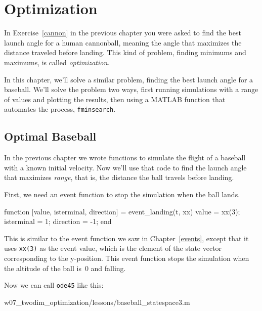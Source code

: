 \documentclass[../../book.tex]{subfiles}
\begin{document}
\chapter{Optimization}


In Exercise~\ref{cannon} in the previous chapter you were asked to find the best launch angle for a human cannonball, meaning the angle that maximizes the distance traveled before landing.  This kind of problem, finding minimums and maximums, is called \emph{optimization}.

In this chapter, we'll solve a similar problem, finding the best launch angle for a baseball.
We'll solve the problem two ways, first running simulations with a range of values and plotting the results, then using a MATLAB function that automates the process, \lstinline{fminsearch}.

\section{Optimal Baseball}

In the previous chapter we wrote functions to simulate the flight of a baseball with a known initial velocity.  Now we'll use that code to find the launch angle that maximizes \emph{range}, that is, the distance the ball travels before landing.


First, we need an event function to stop the simulation when the ball lands.
\begin{code}
function [value, isterminal, direction] = event_landing(t, xx)
    value = xx(3);
    isterminal = 1;
    direction = -1;
end
\end{code}


This is similar to the event function we saw in Chapter~\ref{events}, except that it uses \lstinline{xx(3)} as the event value, which is the element of the state vector corresponding to the y-position.  This event function stops the simulation when the altitude of the ball is~0 and falling.

Now we can call \lstinline{ode45} like this:

{w07_twodim_optimization/lessons/baseball_statespace3.m}
\end{document}
